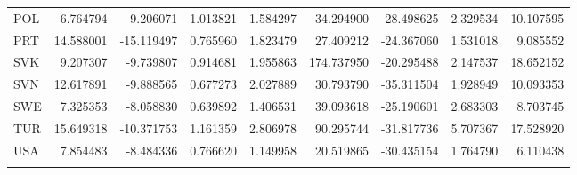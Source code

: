 \documentclass[../main.tex]{subfiles}
\begin{document}
\begin{table}[H]
{\begin{tabular}{lrrrrrrrr}
POL      &       6.764794 &  -9.206071 &  1.013821 &  1.584297 &             34.294900 & -28.498625 &  2.329534 &  10.107595 \\
PRT      &      14.588001 & -15.119497 &  0.765960 &  1.823479 &             27.409212 & -24.367060 &  1.531018 &   9.085552 \\
SVK      &       9.207307 &  -9.739807 &  0.914681 &  1.955863 &            174.737950 & -20.295488 &  2.147537 &  18.652152 \\
SVN      &      12.617891 &  -9.888565 &  0.677273 &  2.027889 &             30.793790 & -35.311504 &  1.928949 &  10.093353 \\
SWE      &       7.325353 &  -8.058830 &  0.639892 &  1.406531 &             39.093618 & -25.190601 &  2.683303 &   8.703745 \\
TUR      &      15.649318 & -10.371753 &  1.161359 &  2.806978 &             90.295744 & -31.817736 &  5.707367 &  17.528920 \\
USA      &       7.854483 &  -8.484336 &  0.766620 &  1.149958 &             20.519865 & -30.435154 &  1.764790 &   6.110438 \\
\bottomrule
\\[-1.8ex]\hline 
\end{tabular}
}
\end{table}
\end{document}
